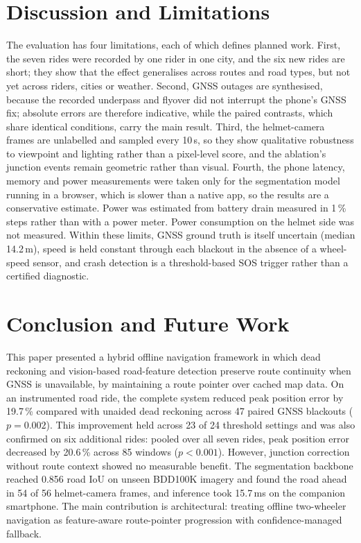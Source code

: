 \documentclass[conference]{IEEEtran}
\begin{document}
\section{Discussion and Limitations}
\label{sec:disc}

The evaluation has four limitations, each of which defines planned work. First, the seven rides were recorded by one rider in one city, and the six new rides are short; they show that the effect generalises across routes and road types, but not yet across riders, cities or weather. Second, GNSS outages are synthesised, because the recorded underpass and flyover did not interrupt the phone's GNSS fix; absolute errors are therefore indicative, while the paired contrasts, which share identical conditions, carry the main result. Third, the helmet-camera frames are unlabelled and sampled every 10\,s, so they show qualitative robustness to viewpoint and lighting rather than a pixel-level score, and the ablation's junction events remain geometric rather than visual. Fourth, the phone latency, memory and power measurements were taken only for the segmentation model running in a browser, which is slower than a native app, so the results are a conservative estimate. Power was estimated from battery drain measured in 1\,\% steps rather than with a power meter. Power consumption on the helmet side was not measured. Within these limits, GNSS ground truth is itself uncertain (median 14.2\,m), speed is held constant through each blackout in the absence of a wheel-speed sensor, and crash detection is a threshold-based SOS trigger rather than a certified diagnostic.

\section{Conclusion and Future Work}
\label{sec:conc}

This paper presented a hybrid offline navigation framework in which dead reckoning and vision-based road-feature detection preserve route continuity when GNSS is unavailable, by maintaining a route pointer over cached map data. On an instrumented road ride, the complete system reduced peak position error by 19.7\,\% compared with unaided dead reckoning across 47 paired GNSS blackouts ($p{=}0.002$). This improvement held across 23 of 24 threshold settings and was also confirmed on six additional rides: pooled over all seven rides, peak position error decreased by 20.6\,\% across 85 windows ($p{<}0.001$). However, junction correction without route context showed no measurable benefit. The segmentation backbone reached 0.856 road IoU on unseen BDD100K imagery and found the road ahead in 54 of 56 helmet-camera frames, and inference took 15.7\,ms on the companion smartphone. The main contribution is architectural: treating offline two-wheeler navigation as feature-aware route-pointer progression with confidence-managed fallback.
\end{document}
